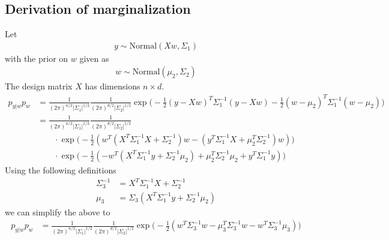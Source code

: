 \documentclass{article}
\newcommand{\Normaldist}{\text{Normal}}
\begin{document}


\begin{appendices}
\section{Derivation of marginalization}
\label{appendix:marginalization}
Let
\begin{align}
  y \sim \Normaldist(Xw,\Sigma_1)
\end{align}
with the prior on $w$ given as
\begin{align}
  w \sim \Normaldist(\mu_2, \Sigma_2)
\end{align}
The design matrix $X$ has dimensions $n \times d$.
\begin{align}
  p_{y|w}p_w & =
    \frac{1}{(2 \pi)^{n/2} |\Sigma_1|^{1/2}}
    \frac{1}{(2 \pi)^{d/2} |\Sigma_2|^{1/2}}
    \exp{ \Big(
      -\frac{1}{2}(y - Xw)^T \Sigma_1^{-1} (y-Xw)
      -\frac{1}{2}(w - \mu_2)^T \Sigma_1^{-1} (w-\mu_2) \Big)} \\
    & = \frac{1}{(2 \pi)^{n/2} |\Sigma_1|^{1/2}}
    \frac{1}{(2 \pi)^{d/2} |\Sigma_2|^{1/2}} \\
    & \quad \quad \cdot \exp{\big(
      -\frac{1}{2}(w^T(X^T \Sigma_1^{-1} X + \Sigma_2^{-1})w
      -(y^T \Sigma_1^{-1} X + \mu_2^T \Sigma_2^{-1})w )
    \big)} \\
    & \quad \quad \cdot \exp{\big(
        -\frac{1}{2}(
          - w^T(X^T \Sigma_1^{-1}y + \Sigma_2^{-1} \mu_2)
          + \mu_2^T \Sigma_2^{-1} \mu_2 + y^T \Sigma_1^{-1}y
        )
    \big)}
\end{align}
Using the following definitions
\begin{align}
  \Sigma_3^{-1} & = X^T \Sigma_1^{-1} X + \Sigma_2^{-1} \\
  \mu_3 & = \Sigma_3 (X^T \Sigma_1^{-1}y + \Sigma_2^{-1} \mu_2)
\end{align}
we can simplify the above to
\begin{align}
    p_{y|w}p_w & =
    \frac{1}{(2 \pi)^{n/2} |\Sigma_1|^{1/2}}
    \frac{1}{(2 \pi)^{d/2} |\Sigma_2|^{1/2}}
    \exp{\big(
      -\frac{1}{2} (w^T \Sigma_3^{-1} w - \mu_3^T \Sigma_3^{-1} w - w^T \Sigma_3^{-1} \mu_3)
    \big)} \\

\end{align}
\end{appendices}
\end{document}
